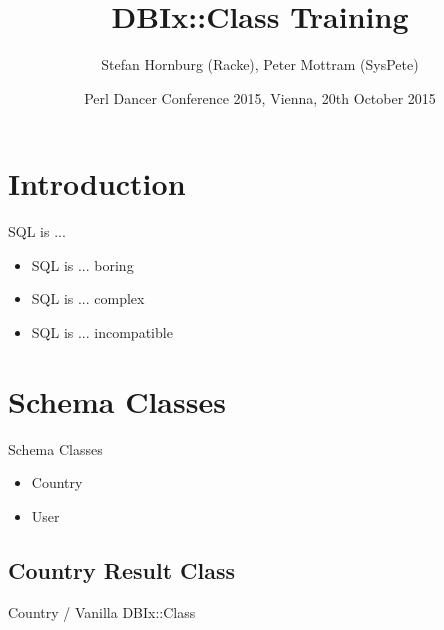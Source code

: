 \usepackage[english]{babel}
\usepackage{caption}
\captionsetup{labelformat=empty,labelsep=none}
\usepackage{verbatim}
\usepackage{hyperref}
\usepackage{listings}
\usepackage{ulem}
\lstset{language=Perl,basicstyle=\normalsize,tabsize=3,showstringspaces=false}

\title{DBIx::Class Training}
\author{Stefan Hornburg (Racke), Peter Mottram (SysPete)}
\date{Perl Dancer Conference 2015, Vienna, 20th October 2015}


\maketitle{}

\begin{frame}
  \titlepage
\end{frame}

\tableofcontents

\section{Introduction}

\begin{frame}{SQL is ...}
\begin{itemize}
\item SQL is ... boring
\item SQL is ... complex
\item SQL is ... incompatible
\end{itemize}
\end{frame}

\section{Schema Classes}

\begin{frame}{Schema Classes}
\begin{itemize}
\item Country
\item User
\end{itemize}
\end{frame}

\subsection{Country Result Class}

\begin{frame}{Country / Vanilla DBIx::Class}

\end{frame}


